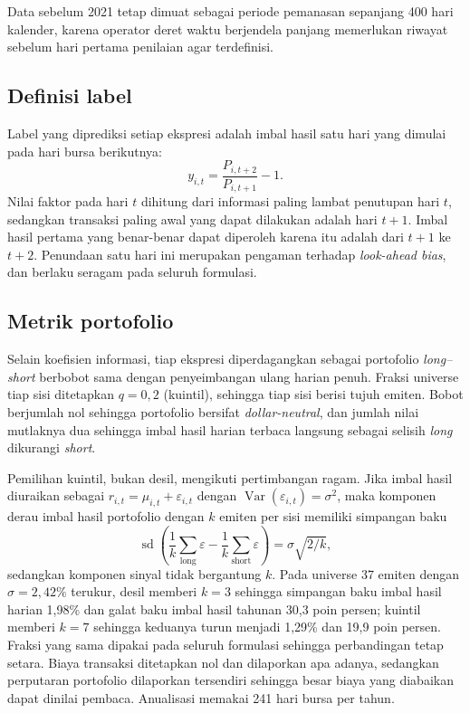 \documentclass{laporanta1statugm}
\begin{document}
Data sebelum 2021 tetap dimuat sebagai periode pemanasan sepanjang 400 hari
kalender, karena operator deret waktu berjendela panjang memerlukan riwayat
sebelum hari pertama penilaian agar terdefinisi.

\subsection{Definisi label}

Label yang diprediksi setiap ekspresi adalah imbal hasil satu hari yang dimulai
pada hari bursa berikutnya:
\begin{equation}
  y_{i,t} = \frac{P_{i,t+2}}{P_{i,t+1}} - 1 .
  \label{eq:label}
\end{equation}
Nilai faktor pada hari $t$ dihitung dari informasi paling lambat penutupan hari
$t$, sedangkan transaksi paling awal yang dapat dilakukan adalah hari $t+1$.
Imbal hasil pertama yang benar-benar dapat diperoleh karena itu adalah dari
$t+1$ ke $t+2$. Penundaan satu hari ini merupakan pengaman terhadap
\textit{look-ahead bias}, dan berlaku seragam pada seluruh formulasi.

\subsection{Metrik portofolio}

Selain koefisien informasi, tiap ekspresi diperdagangkan sebagai portofolio
\textit{long--short} berbobot sama dengan penyeimbangan ulang harian penuh.
Fraksi universe tiap sisi ditetapkan $q = 0{,}2$ (kuintil), sehingga tiap sisi
berisi tujuh emiten. Bobot berjumlah nol sehingga portofolio bersifat
\textit{dollar-neutral}, dan jumlah nilai mutlaknya dua sehingga imbal hasil
harian terbaca langsung sebagai selisih \textit{long} dikurangi \textit{short}.

Pemilihan kuintil, bukan desil, mengikuti pertimbangan ragam. Jika imbal hasil
diuraikan sebagai $r_{i,t} = \mu_{i,t}+\varepsilon_{i,t}$ dengan
$\operatorname{Var}(\varepsilon_{i,t}) = \sigma^2$, maka komponen derau imbal
hasil portofolio dengan $k$ emiten per sisi memiliki simpangan baku
\begin{equation}
  \operatorname{sd}\!\left(\frac{1}{k}\sum_{\text{long}}\varepsilon
  - \frac{1}{k}\sum_{\text{short}}\varepsilon\right) = \sigma\sqrt{2/k},
  \label{eq:derauportofolio}
\end{equation}
sedangkan komponen sinyal tidak bergantung $k$. Pada universe 37 emiten dengan
$\sigma = 2{,}42\%$ terukur, desil memberi $k=3$ sehingga simpangan baku imbal
hasil harian 1,98\% dan galat baku imbal hasil tahunan 30,3 poin persen; kuintil
memberi $k=7$ sehingga keduanya turun menjadi 1,29\% dan 19,9 poin persen.
Fraksi yang sama dipakai pada seluruh formulasi sehingga perbandingan tetap
setara. Biaya transaksi ditetapkan nol dan dilaporkan apa adanya, sedangkan
perputaran portofolio dilaporkan tersendiri sehingga besar biaya yang diabaikan
dapat dinilai pembaca. Anualisasi memakai 241 hari bursa per tahun.
\end{document}
